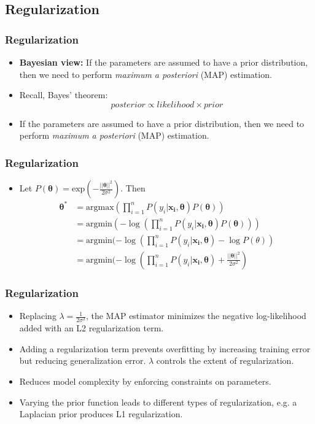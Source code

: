 \subsection{Regularization}
\begin{frame}
\frametitle{Regularization}
\begin{itemize}
\item \textbf{Bayesian view:} If the parameters are assumed to have a prior distribution, then we need to perform \textit{maximum a posteriori} (MAP) estimation.
\item Recall, Bayes' theorem:
\begin{equation}
posterior \propto likelihood \times prior
\end{equation}
\item If the parameters are assumed to have a prior distribution, then we need to perform \textit{maximum a posteriori} (MAP) estimation.
\end{itemize}
\end{frame}
\begin{frame}
\frametitle{Regularization}
\begin{itemize}
\item Let $P(\mathbf{\theta}) = \text{exp}(-\frac{||\mathbf{\theta}||^2}{2 \sigma^2})$. Then
\begin{equation}
\begin{split}
\mathbf{\theta}^* &= \text{argmax} (\prod_{i=1}^n P(y_i|\mathbf{x_i, \theta}) P(\mathbf{\theta}))\\
&= \text{argmin} (-\log (\prod_{i=1}^n P(y_i|\mathbf{x_i, \theta}) P(\mathbf{\theta})))\\
&= \text{argmin} (-\log (\prod_{i=1}^n P(y_i|\mathbf{x_i, \theta}) - \log P(\theta))\\
&= \text{argmin} (-\log (\prod_{i=1}^n P(y_i|\mathbf{x_i, \theta}) + \frac{||\mathbf{\theta}||^2}{2 \sigma^2})
\end{split}
\end{equation}
\end{itemize}
\end{frame}
\begin{frame}
\frametitle{Regularization}
\begin{itemize}
\item Replacing $\lambda = \frac{1}{2 \sigma^2}$, the MAP estimator minimizes the negative log-likelihood added with an L2 regularization term.
\item Adding a regularization term prevents overfitting by increasing training error but reducing generalization error. $\lambda$ controls the extent of regularization.
\item Reduces model complexity by enforcing constraints on parameters.
\item Varying the prior function leads to different types of regularization, e.g. a Laplacian prior produces L1 regularization.
\end{itemize}
\end{frame}
